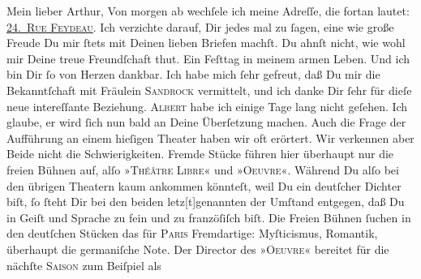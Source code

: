 \begin{ledgroupsized}[t]{13cm}
           \pstart\center{}Mein lieber Arthur,\pend\pstart
           Von morgen ab wechſele ich meine Adreſſe, die fortan
               lautet: \textsc{\uline{24. Rue Feydeau}}.\pend
           \pstart
           Ich verzichte darauf, Dir  jedes mal zu ſagen, eine wie große Freude Du mir ſtets mit Deinen lieben
               Briefen machſt. Du ahnſt nicht, wie wohl mir Deine treue Freundſchaft thut. Ein
               Feſttag in meinem armen Leben. Und ich bin Dir ſo von Herzen dankbar.\pend
           \pstart
           Ich habe mich ſehr {\pb}gefreut, daß Du mir die
               Bekanntſchaft mit Fräulein \textsc{Sandrock} vermittelt, und ich danke Dir ſehr für dieſe neue intereſſante Beziehung.\pend
           \pstart
           \textsc{Albert} habe ich einige Tage lang nicht geſehen. Ich glaube, er wird ſich nun bald an
               Deine Überſetzung machen. Auch
               die Frage der Aufführung an einem hieſigen Theater haben wir oft erörtert. Wir
               verkennen aber Beide nicht
               die Schwierigkeiten. Fremde Stücke führen hier überhaupt nur die freien Bühnen auf, alſo »\textsc{Théâtre Libre}« und »\textsc{Oeuvre}«. Während Du alſo bei den übrigen Theatern kaum {\pb}ankommen könnteſt, weil Du ein deutſcher Dichter
               biſt, ſo ſteht Dir bei den beiden letz{[}t{]}genannten der Umſtand
               entgegen, daß Du in Geiſt und Sprache zu fein und zu franzöſiſch biſt. Die Freien Bühnen ſuchen in den
               deutſchen Stücken das für \textsc{Paris} Fremdartige: Myſticismus, Romantik, überhaupt die germaniſche Note. Der Director des »\textsc{Oeuvre}« bereitet für die nächſte \textsc{Saison} zum Beiſpiel als

\end{ledgroupsized}
